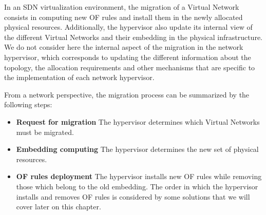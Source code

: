 In an SDN virtualization environment, the migration of a Virtual Network consists in computing new OF rules and install them in the newly allocated physical resources. Additionally, the hypervisor also update its internal view of the different Virtual Networks and their embedding in the physical infrastructure.
We do not consider here the internal aspect of the migration in the network hypervisor, which corresponds to updating the different information about the topology, the allocation requirements and other mechanisms that are specific to the implementation of each network hypervisor.

From a network perspective, the migration process can be summarized by the following steps:

\begin{itemize}
    \item \textbf{Request for migration} The hypervisor determines which Virtual Networks must be migrated.
    \item \textbf{Embedding computing} The hypervisor determines the new set of physical resources.
    \item \textbf{OF rules deployment} The hypervisor installs new OF rules while removing those which belong to the old embedding.
The order in which the hypervisor installs and removes OF rules is considered by some solutions that we will cover later on this chapter.
\end{itemize}

